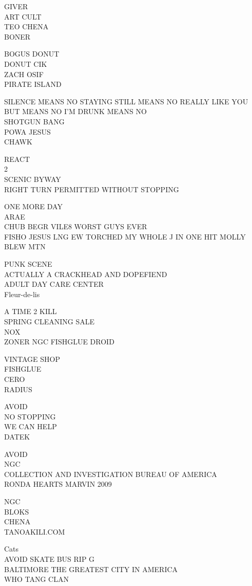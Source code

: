 \documentclass[10pt,letterpaper]{article}
\begin{document}
GIVER\\
ART CULT\\
TEO CHENA\\
BONER

BOGUS DONUT\\
DONUT CIK\\
ZACH OSIF\\
PIRATE ISLAND

SILENCE MEANS NO STAYING STILL MEANS NO REALLY LIKE YOU BUT MEANS NO I'M DRUNK MEANS NO\\
SHOTGUN BANG\\
POWA JESUS\\
CHAWK

REACT\\
2\\
SCENIC BYWAY\\
RIGHT TURN PERMITTED WITHOUT STOPPING

ONE MORE DAY\\
ARAE\\
CHUB BEGR VILE8 WORST GUYS EVER\\
FISHO JESUS LNG EW TORCHED MY WHOLE J IN ONE HIT MOLLY BLEW MTN

PUNK SCENE\\
ACTUALLY A CRACKHEAD AND DOPEFIEND\\
ADULT DAY CARE CENTER\\
Fleur{-}de{-}lis

A TIME 2 KILL\\
SPRING CLEANING SALE\\
NOX\\
ZONER NGC FISHGLUE DROID

VINTAGE SHOP\\
FISHGLUE\\
CERO\\
RADIUS

AVOID\\
NO STOPPING\\
WE CAN HELP\\
DATEK

AVOID\\
NGC\\
COLLECTION AND INVESTIGATION BUREAU OF AMERICA\\
RONDA HEARTS MARVIN 2009

NGC\\
BLOKS\\
CHENA\\
TANOAKILI.COM

Cats\\
AVOID SKATE BUS RIP G\\
BALTIMORE THE GREATEST CITY IN AMERICA\\
WHO TANG CLAN
\end{document}
